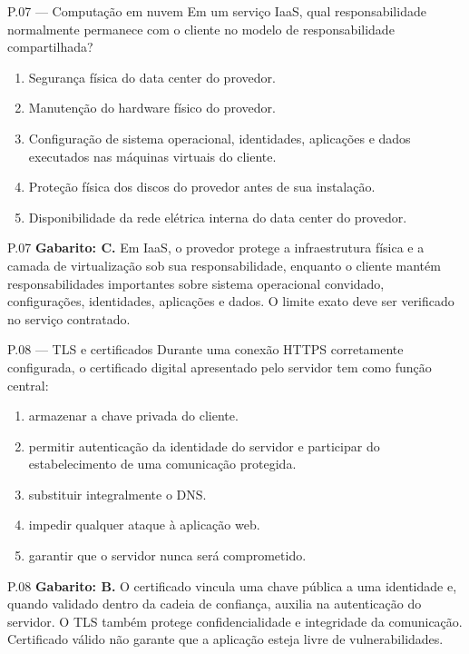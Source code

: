 \begin{questao}{ P.07 — Computação em nuvem}
Em um serviço IaaS, qual responsabilidade normalmente permanece com o cliente no modelo de responsabilidade compartilhada?
\begin{enumerate}[label=\Alph*)]
\item Segurança física do data center do provedor.
\item Manutenção do hardware físico do provedor.
\item Configuração de sistema operacional, identidades, aplicações e dados executados nas máquinas virtuais do cliente.
\item Proteção física dos discos do provedor antes de sua instalação.
\item Disponibilidade da rede elétrica interna do data center do provedor.
\end{enumerate}
\end{questao}
\begin{solucao}{P.07}
\textbf{Gabarito: C.} Em IaaS, o provedor protege a infraestrutura física e a camada de virtualização sob sua responsabilidade, enquanto o cliente mantém responsabilidades importantes sobre sistema operacional convidado, configurações, identidades, aplicações e dados. O limite exato deve ser verificado no serviço contratado.
\end{solucao}

\begin{questao}{ P.08 — TLS e certificados}
Durante uma conexão HTTPS corretamente configurada, o certificado digital apresentado pelo servidor tem como função central:
\begin{enumerate}[label=\Alph*)]
\item armazenar a chave privada do cliente.
\item permitir autenticação da identidade do servidor e participar do estabelecimento de uma comunicação protegida.
\item substituir integralmente o DNS.
\item impedir qualquer ataque à aplicação web.
\item garantir que o servidor nunca será comprometido.
\end{enumerate}
\end{questao}
\begin{solucao}{P.08}
\textbf{Gabarito: B.} O certificado vincula uma chave pública a uma identidade e, quando validado dentro da cadeia de confiança, auxilia na autenticação do servidor. O TLS também protege confidencialidade e integridade da comunicação. Certificado válido não garante que a aplicação esteja livre de vulnerabilidades.
\end{solucao}

